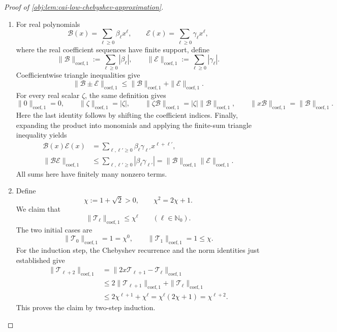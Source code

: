 \documentclass[11pt]{article}
\begin{document}
\begin{proof}[Proof of \cref{obj:lem:cai-low-chebyshev-approximation}]
\begin{enumerate}
\item For real polynomials
\[
\mathcal B(x)=\sum_{\ell\ge0}\beta_\ell x^\ell,
\qquad
\mathcal E(x)=\sum_{\ell\ge0}\gamma_\ell x^\ell,
\]
where the real coefficient sequences have finite support, define
\[
\|\mathcal B\|_{\mathrm{coef},1}
:=\sum_{\ell\ge0}|\beta_\ell|,
\qquad
\|\mathcal E\|_{\mathrm{coef},1}
:=\sum_{\ell\ge0}|\gamma_\ell|.
\]
Coefficientwise triangle inequalities give
\[
\|\mathcal B\pm\mathcal E\|_{\mathrm{coef},1}
\le
\|\mathcal B\|_{\mathrm{coef},1}
+\|\mathcal E\|_{\mathrm{coef},1}.
\]
For every real scalar \(\zeta\), the same definition gives
\[
\|0\|_{\mathrm{coef},1}=0,\qquad
\|\zeta\|_{\mathrm{coef},1}=|\zeta|,\qquad
\|\zeta\mathcal B\|_{\mathrm{coef},1}
=|\zeta|\|\mathcal B\|_{\mathrm{coef},1},\qquad
\|x\mathcal B\|_{\mathrm{coef},1}
=\|\mathcal B\|_{\mathrm{coef},1}.
\]
Here the last identity follows by shifting the coefficient indices. Finally, expanding the product into monomials and applying the finite-sum triangle inequality yields
\[
\begin{aligned}
\mathcal B(x)\mathcal E(x)
&=\sum_{\ell,\ell'\ge0}
 \beta_\ell\gamma_{\ell'}x^{\ell+\ell'},\\
\|\mathcal B\mathcal E\|_{\mathrm{coef},1}
&\le\sum_{\ell,\ell'\ge0}
 |\beta_\ell\gamma_{\ell'}|
=\|\mathcal B\|_{\mathrm{coef},1}
 \|\mathcal E\|_{\mathrm{coef},1}.
\end{aligned}
\]
All sums here have finitely many nonzero terms.

\item Define
\[
\chi:=1+\sqrt2>0,\qquad \chi^2=2\chi+1.
\]
We claim that
\[
\|\mathcal T_\ell\|_{\mathrm{coef},1}\le\chi^\ell
\qquad(\ell\in\mathbb N_0).
\]
The two initial cases are
\[
\|\mathcal T_0\|_{\mathrm{coef},1}=1=\chi^0,
\qquad
\|\mathcal T_1\|_{\mathrm{coef},1}=1\le\chi.
\]
For the induction step, the Chebyshev recurrence and the norm identities just established give
\[
\begin{aligned}
\|\mathcal T_{\ell+2}\|_{\mathrm{coef},1}
&=\|2x\mathcal T_{\ell+1}-\mathcal T_\ell\|_{\mathrm{coef},1}\\
&\le2\|\mathcal T_{\ell+1}\|_{\mathrm{coef},1}
 +\|\mathcal T_\ell\|_{\mathrm{coef},1}\\
&\le2\chi^{\ell+1}+\chi^\ell
=\chi^\ell(2\chi+1)
=\chi^{\ell+2}.
\end{aligned}
\]
This proves the claim by two-step induction.


\end{enumerate}
\end{proof}
\end{document}
